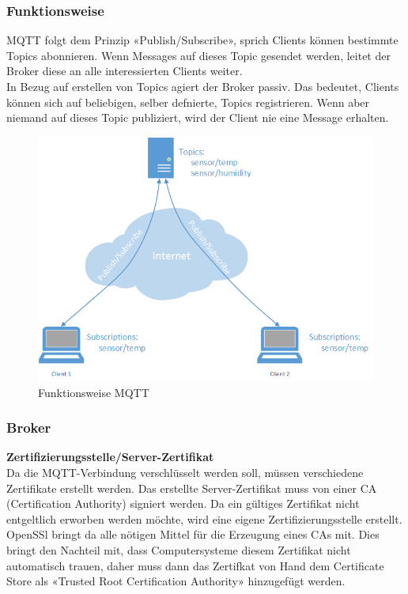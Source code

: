 \subsubsection{Funktionsweise}
MQTT folgt dem Prinzip «Publish/Subscribe», sprich Clients können bestimmte Topics abonnieren. Wenn Messages auf dieses Topic gesendet werden, leitet der Broker diese an alle interessierten Clients weiter. \\
In Bezug auf erstellen von Topics agiert der Broker passiv. Das bedeutet, Clients können sich auf beliebigen, selber defnierte, Topics registrieren. Wenn aber niemand auf dieses Topic publiziert, wird der Client nie eine Message erhalten.

\begin{figure}[H]
	\centering
		\includegraphics[scale=0.6]{report/img/mqttFunktionsweise}
	\caption{Funktionsweise MQTT}
	\label{fig:funktionsweiseMQTT}
\end{figure}

\subsubsection{Broker}

\textbf{Zertifizierungsstelle/Server-Zertifikat} \\
Da die MQTT-Verbindung verschlüsselt werden soll, müssen verschiedene Zertifikate erstellt werden. Das erstellte Server-Zertifikat muss von einer CA (Certification Authority) signiert werden. Da ein gültiges Zertifikat nicht entgeltlich erworben werden möchte, wird eine eigene Zertifizierungsstelle erstellt. OpenSSl bringt da alle nötigen Mittel für die Erzeugung eines CAs mit. Dies bringt den Nachteil mit, dass Computersysteme diesem Zertifikat nicht automatisch trauen, daher muss dann das Zertifkat von Hand dem Certificate Store als «Trusted Root Certification Authority» hinzugefügt werden. \\

